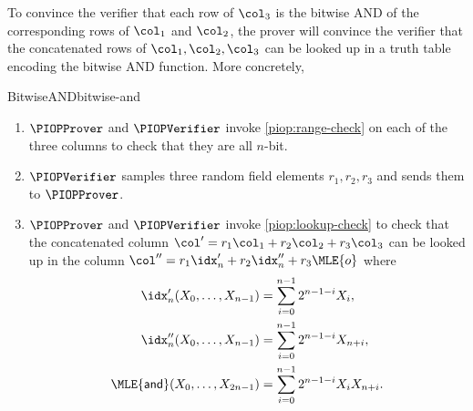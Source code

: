 \fi

To convince the verifier that each row of $\col_3$ is the bitwise AND of the corresponding rows of $\col_1$ and $\col_2$, the prover will convince the verifier that the concatenated rows of $\col_1, \col_2, \col_3$ can be looked up in a truth table encoding the bitwise AND function. More concretely,
\begin{DefinePIOP}{BitwiseAND}{bitwise-and}
    \begin{enumerate}[nosep]
        \item $\PIOPProver$ and $\PIOPVerifier$ invoke \cref{piop:range-check} on each of the three columns to check that they are all $n$-bit.
        \item $\PIOPVerifier$ samples three random field elements $r_1, r_2,r_3$ and sends them to $\PIOPProver$.
        \item $\PIOPProver$ and $\PIOPVerifier$ invoke \cref{piop:lookup-check} to check that the concatenated column $\col' = r_1\col_1 + r_2\col_2 + r_3\col_3$ can be looked up in the column $\col'' = r_1\idx'_n+r_2\idx''_n+r_3\MLE{o}$ where
        \begin{align*}
            \idx'_n(X_0,\ldots,X_{n-1}) &= \sum_{i=0}^{n-1} 2^{n-1-i} X_i, \\
            \idx''_n(X_0,\ldots,X_{n-1}) &= \sum_{i=0}^{n-1} 2^{n-1-i} X_{n+i}, \\
            \MLE{\mathsf{and}}(X_0,\ldots,X_{2n-1}) &= \sum_{i=0}^{n-1} 2^{n-1-i} X_iX_{n+i}.
        \end{align*}
    \end{enumerate}
\end{DefinePIOP}




